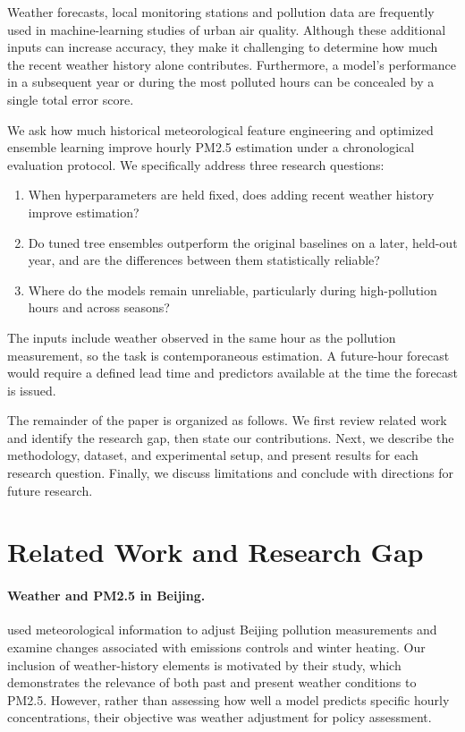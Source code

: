 \documentclass[11pt]{article}
\begin{document}
Weather forecasts, local monitoring stations and pollution data are frequently used in machine-learning studies of urban air quality\citep{zheng2015}. Although these additional inputs can increase accuracy, they make it challenging to determine how much the recent weather history alone contributes. Furthermore, a model's performance in a subsequent year or during the most polluted hours can be concealed by a single total error score.

We ask how much historical meteorological feature engineering and optimized ensemble learning improve hourly PM2.5 estimation under a chronological evaluation protocol. We specifically address three research questions: \begin{enumerate} 
\item[\textbf{RQ1}] When hyperparameters are held fixed, does adding recent weather history improve estimation? 
\item[\textbf{RQ2}]Do tuned tree ensembles outperform the original baselines on a later, held-out year, and are the differences between them statistically reliable?
\item[\textbf{RQ3}]Where do the models remain unreliable, particularly during high-pollution hours and across seasons?
\end{enumerate}

The inputs include weather observed in the same hour as the pollution measurement, so the task is contemporaneous estimation. A future-hour forecast would require a defined lead time and predictors available at the time the forecast is issued.

The remainder of the paper is organized as follows. We first review related work and identify the research gap, then state our contributions. Next, we describe the methodology, dataset, and experimental setup, and present results for each research question. Finally, we discuss limitations and conclude with directions for future research.

\section{Related Work and Research Gap}
\paragraph{Weather and PM2.5 in Beijing.}
\citet{liang2015} used meteorological information to adjust Beijing pollution measurements and examine changes associated with emissions controls and winter heating. Our inclusion of weather-history elements is motivated by their study, which demonstrates the relevance of both past and present weather conditions to PM2.5. However, rather than assessing how well a model predicts specific hourly concentrations, their objective was weather adjustment for policy assessment. 
\end{document}
